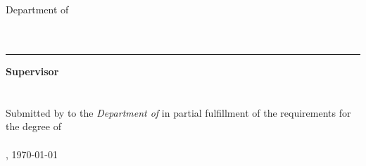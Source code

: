 \begin{titlepage}
    \begin{center}
        {\Large%
           \textsc{\university{}}%
        }
        \\\medskip
        {%
            \textbf{
                \universityFaculty{}
            }\\
            Department of \universityDepartment{}%
        }
        \\\vfill
        {\Huge%
            \textbf{\documentTitle{}}%
        }
        \\\medskip
        {\large%
            \textsl{%
                \documentSubtitle{}%
            }
        }
        \\\vfill
        {\Large%
            \textbf{\shortTitle{}}%
        }
    \end{center}
	\vfill
	\rule{\textwidth}{.4pt}
	\vfill
    \begin{flushright}
        \textbf{Supervisor}\\
        \medskip
        \researchAdvisor{}\\
        \secondReader{}\\
        \bigskip
        Submitted by \textbf{\documentAuthor{}} to the \textsl{Department of \universityDepartment{}} in partial fulfillment of the requirements for the degree of\\
        \textbf{\academicDegree{}}\\
        \medskip{}
        \documentPlace{}, \germanDate{}\today{}\\
    \end{flushright}
\end{titlepage}
